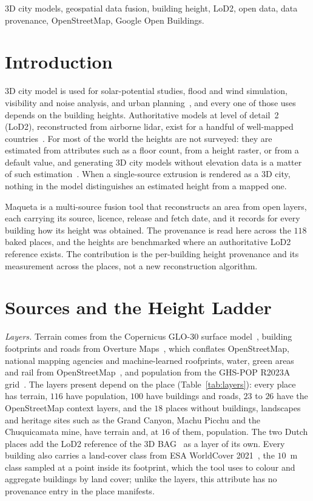 \documentclass[journal]{IEEEtran}
\begin{document}
\begin{IEEEkeywords}
3D city models, geospatial data fusion, building height, LoD2, open data, data provenance, OpenStreetMap, Google
Open Buildings.
\end{IEEEkeywords}

\section{Introduction}

 3D city model is used for solar-potential studies, flood and wind simulation, visibility and
noise analysis, and urban planning~\cite{biljecki15}, and every one of those uses depends on the building heights.
Authoritative models at level of detail~2 (LoD2), reconstructed from airborne lidar, exist for a handful of
well-mapped countries~\cite{peters}. For most of the world the heights are not surveyed: they are estimated from
attributes such as a floor count, from a height raster, or from a default value, and generating 3D city models
without elevation data is a matter of such estimation~\cite{biljecki17}. When a single-source extrusion is rendered
as a 3D city, nothing in the model distinguishes an estimated height from a mapped one.

Maqueta is a multi-source fusion tool that reconstructs an area from open layers, each carrying its source, licence,
release and fetch date, and it records for every building how its height was obtained. The provenance is read here
across the $118$ baked places, and the heights are benchmarked where an authoritative LoD2 reference exists. The
contribution is the per-building height provenance and its measurement across the places, not a new reconstruction
algorithm.

\section{Sources and the Height Ladder}\label{sec:method}

\emph{Layers.} Terrain comes from the Copernicus GLO-30 surface model~\cite{copdem}, building footprints and roads from
Overture Maps~\cite{overture}, which conflates OpenStreetMap, national mapping agencies and machine-learned
roofprints, water, green areas and rail from OpenStreetMap~\cite{osm}, and population from the GHS-POP R2023A
grid~\cite{ghspop}. The layers present depend on the place (Table~\ref{tab:layers}): every place has terrain, $116$
have population, $100$ have buildings and roads, $23$ to $26$ have the OpenStreetMap context layers, and the $18$
places without buildings, landscapes and heritage sites such as the Grand Canyon, Machu Picchu and the Chuquicamata
mine, have terrain and, at $16$ of them, population. The two Dutch places add
the LoD2 reference of the 3D BAG~\cite{peters} as a layer of its own. Every building also carries a land-cover
class from ESA WorldCover 2021~\cite{worldcover}, the $10$~m class sampled at a point inside its footprint, which
the tool uses to colour and aggregate buildings by land cover; unlike the layers, this attribute has no provenance
entry in the place manifests.
\end{document}
